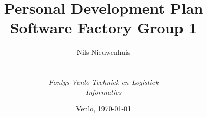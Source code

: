 
\def\Company{\textit{FSG1 - Fontys SoFa Group 1}}
\def\Institute{\textit{Fontys Venlo Techniek en Logistiek}}
\def\Course{\textit{Informatics}}

\def\BoldTitle{Personal Development Plan}
\def\Subtitle{Software Factory Group 1}
\def\Authors{Nils Nieuwenhuis}


\title{\textbf{\BoldTitle}\\\Subtitle}
\author{\Authors \\ \\ \\ \Institute\\ \Course}
\date{Venlo, \today}
